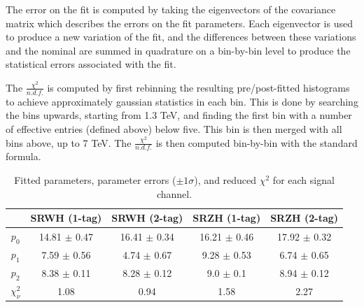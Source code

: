 The error on the fit is computed by taking the eigenvectors of the covariance matrix which describes the errors on the fit parameters.
Each eigenvector is used to produce a new variation of the fit, and the differences between these variations and the nominal are summed in quadrature on a bin-by-bin level to produce the statistical errors associated with the fit.

The $\frac{\chi^2}{n.d.f.}$ is computed by first rebinning the resulting pre/post-fitted histograms to achieve approximately gaussian statistics in each bin.
This is done by searching the bins upwards, starting from 1.3 TeV, and finding the first bin with a number of effective entries (defined above) below five.
This bin is then merged with all bins above, up to 7 TeV.
The $\frac{\chi^2}{n.d.f.}$ is then computed bin-by-bin with the standard formula.

\begin{table}[!htb]
\begin{center}
\begin{tabular}{|c|c|c|c|c|}
\hline
 & SRWH (1-tag) & SRWH (2-tag) & SRZH (1-tag) & SRZH (2-tag) \\ \hline
    $p_0$ & 14.81 $\pm$ 0.47 & 16.41 $\pm$ 0.34 & 16.21 $\pm$ 0.46 & 17.92 $\pm$ 0.32 \\
\hline
    $p_1$ & 7.59 $\pm$ 0.56 & 4.74 $\pm$ 0.67 & 9.28 $\pm$ 0.53 & 6.74 $\pm$ 0.65 \\
\hline
    $p_2$ & 8.38 $\pm$ 0.11 & 8.28 $\pm$ 0.12 & 9.0 $\pm$ 0.1 & 8.94 $\pm$ 0.12 \\
\hline
    $\chi_{\nu}^2$ & 1.08 & 0.94 & 1.58 & 2.27 \\
\hline
\end{tabular}
\caption{Fitted parameters, parameter errors ($\pm 1 \sigma$), and reduced $\chi^2$ for each signal channel.}
\label{tab:fit_params}
\end{center}
\end{table}


